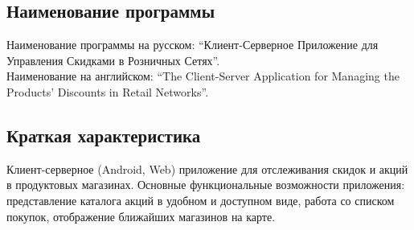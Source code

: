\subsection{Наименование программы}
Наименование программы на русском: 
``Клиент-Серверное Приложение для Управления Скидками в Розничных Сетях''. \\
Наименование на английском: 
``The Client-Server Application for Managing the Products' Discounts in Retail Networks''. \\


\subsection{Краткая характеристика}
Клиент-серверное (Android, Web) приложение для отслеживания скидок и акций в продуктовых магазинах.
Основные функциональные возможности приложения: представление каталога акций в удобном и доступном
виде, работа со списком покупок, отображение ближайших магазинов на карте.
